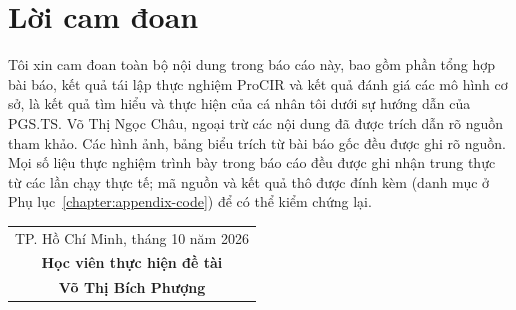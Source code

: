 \chapter*{Lời cam đoan}
\onehalfspacing
\vspace{1.0cm}

Tôi xin cam đoan toàn bộ nội dung trong báo cáo này, bao gồm phần tổng hợp bài báo, kết quả tái lập thực nghiệm ProCIR và kết quả đánh giá các mô hình cơ sở, là kết quả tìm hiểu và thực hiện của cá nhân tôi dưới sự hướng dẫn của PGS.TS. Võ Thị Ngọc Châu, ngoại trừ các nội dung đã được trích dẫn rõ nguồn tham khảo. Các hình ảnh, bảng biểu trích từ bài báo gốc đều được ghi rõ nguồn. Mọi số liệu thực nghiệm trình bày trong báo cáo đều được ghi nhận trung thực từ các lần chạy thực tế; mã nguồn và kết quả thô được đính kèm (danh mục ở Phụ lục~\ref{chapter:appendix-code}) để có thể kiểm chứng lại. \par

\begin{flushright}
\begin{tabular}{@{}c@{}}
    TP. Hồ Chí Minh, tháng 10 năm 2026\\
    \textbf{Học viên thực hiện đề tài}\\ [2cm]
    \textbf{Võ Thị Bích Phượng}
\end{tabular}
\end{flushright}

